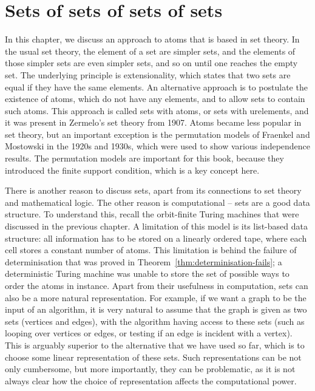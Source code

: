 \chapter{Sets of sets of sets of sets}
\label{cha:sets-of-sets-of-sets}

In this chapter, we discuss an approach to  atoms that is based in set theory. In the usual set theory, the element of a set are simpler sets, and the elements of those simpler sets are even simpler sets, and so on until one reaches the empty set. The underlying principle is extensionality, which states that  two sets are equal if they have the same elements. An alternative approach is to postulate the existence of atoms, which do not have any elements, and to allow sets to contain such atoms. This approach is called sets with atoms, or sets with urelements, and it was present in Zermelo's set theory from 1907. Atoms became less popular in set theory, but an important exception is the permutation models of Fraenkel and Mostowski in the 1920s and 1930s, which were used to show various independence results. The permutation models are important for this book, because they introduced the finite support condition, which is a key concept here.

There is another reason to discuss sets, apart from its connections to set theory and mathematical logic. The other reason is computational -- sets are a good data structure. To understand this, recall the orbit-finite Turing machines that were discussed in the previous chapter. A limitation of this model is its list-based data structure: all information has to be stored on a linearly ordered tape, where each cell stores a constant number of atoms. This limitation is behind the failure of determinisation that was proved in Theorem~\ref{thm:determinisation-fails}; a deterministic Turing machine was unable to store the set of possible ways to order the atoms in \cfi instance. Apart from their usefulness in computation, sets can also be a more natural representation. For example, if we want a graph to be the input of an algorithm, it is very natural to assume that the graph is given as two sets (vertices and edges), with the algorithm having access to these sets (such as looping over vertices or edges, or testing if an edge is incident with a vertex). This is arguably superior to the  alternative that we have used so far, which is to choose some linear representation of these sets. Such representations can be not only cumbersome, but more importantly, they can be problematic, as  it is not always  clear how the choice of representation affects the computational power. 

